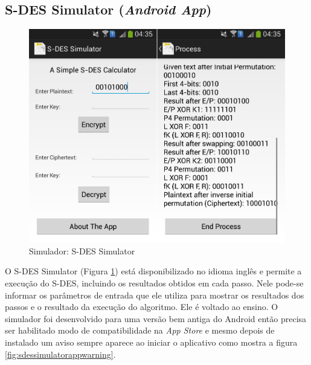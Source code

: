 
\subsection{S-DES Simulator (\textit{Android App})}

\begin{figure}[H]
    \centering
    \caption{Simulador: S-DES Simulator}
    \label{fig:sdessimulatorapp}
    \includegraphics[width=.75\linewidth]{Simuladores/SDESSimulatorApp.png}
\end{figure}

O S-DES Simulator (Figura \ref{fig:sdessimulatorapp}) está disponibilizado no idioma inglês e permite a execução do S-DES, incluindo os resultados obtidos em cada passo. Nele pode-se informar os parâmetros de entrada que ele utiliza para mostrar os resultados dos passos e o resultado da execução do algoritmo. Ele é voltado ao ensino. O simulador foi desenvolvido para uma versão bem antiga do Android então precisa ser habilitado modo de compatibilidade na \textit{App Store} e mesmo depois de instalado um aviso sempre aparece ao iniciar o aplicativo como mostra a figura \ref{fig:sdessimulatorappwarning}. \cite{mountogiannakis15}

